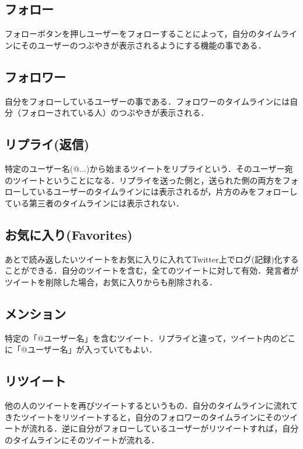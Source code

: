 \subsection{フォロー}

フォローボタンを押しユーザーをフォローすることによって，自分のタイムラインにそのユーザーのつぶやきが表示されるようにする機能の事である．

\subsection{フォロワー}

自分をフォローしているユーザーの事である．フォロワーのタイムラインには自分（フォローされている人）のつぶやきが表示される．

\subsection{リプライ(返信)}

特定のユーザー名(@...)から始まるツイートをリプライという．そのユーザー宛のツイートということになる．リプライを送った側と，送られた側の両方をフォローしているユーザーのタイムラインには表示されるが，片方のみをフォローしている第三者のタイムラインには表示されない．

\subsection{お気に入り(Favorites)}

あとで読み返したいツイートをお気に入りに入れてTwitter上でログ(記録)化することができる．自分のツイートを含む，全てのツイートに対して有効．発言者がツイートを削除した場合，お気に入りからも削除される．

\subsection{メンション}

特定の「@ユーザー名」を含むツイート．リプライと違って，ツイート内のどこに「@ユーザー名」が入っていてもよい．


\subsection{リツイート}

他の人のツイートを再びツイートするというもの．自分のタイムラインに流れてきたツイートをリツイートすると，自分のフォロワーのタイムラインにそのツイートが流れる．逆に自分がフォローしているユーザーがリツイートすれば，自分のタイムラインにそのツイートが流れる．

